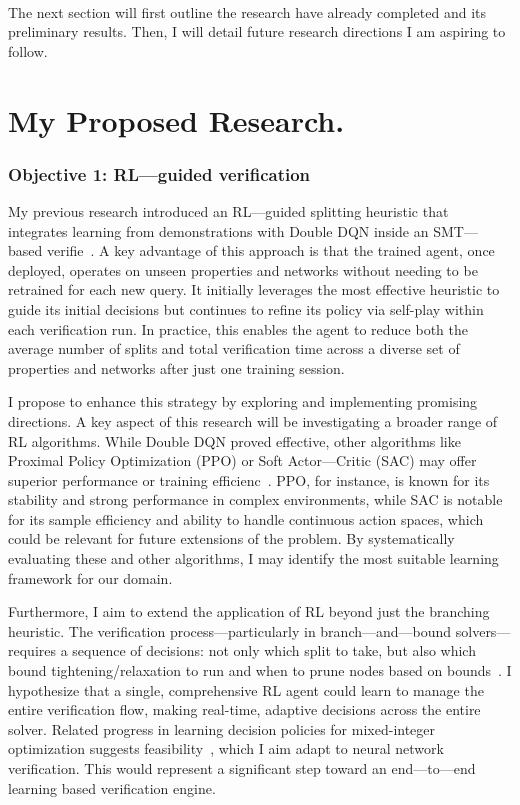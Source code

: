 \documentclass{llncs}
\begin{document}
\paragraph{}
The next section will first outline the research have already completed and its preliminary results. 
Then, I will detail future research directions I am aspiring to follow.

\section{My Proposed Research.}
\subsubsection{Objective 1: RL---guided verification}
My previous research introduced an RL---guided splitting heuristic that integrates learning 
from demonstrations with Double DQN inside an SMT---based verifie~\cite{Katz2019Marabou,KBD17,vanHasselt2016DoubleDQN,hester2018dqfd}.
A key advantage of this approach is that the trained agent, once deployed, operates on unseen 
properties and networks without needing to be retrained for each new query. It initially leverages 
the most effective heuristic to guide its initial decisions but continues to refine its policy via 
self-play within each verification run. In practice, this enables the agent to reduce both the average 
number of splits and total verification time across a diverse set of properties 
and networks after just one training session.

I propose to enhance this strategy by exploring and implementing promising directions. 
A key aspect of this research will be investigating a broader range of RL algorithms. 
While Double DQN proved effective, other algorithms like Proximal Policy Optimization (PPO) or 
Soft Actor---Critic (SAC) may offer superior performance or training efficienc~\cite{Schulman2017PPO,Haarnoja2018SAC}. 
PPO, for instance, is known for its stability and strong performance in complex environments, 
while SAC is notable for its sample efficiency and ability to handle continuous action spaces, 
which could be relevant for future extensions of the problem. By systematically evaluating these 
and other algorithms, I may identify the most suitable learning framework for our domain.

Furthermore, I aim to extend the application of RL beyond just the branching heuristic.
The verification process—particularly in branch---and---bound solvers—requires a sequence of
decisions: not only which split to take, but also which bound tightening/relaxation to run
and when to prune nodes based on bounds~\cite{BLTTKK-JMLR2020,KBD17,Katz2019Marabou}.
I hypothesize that a single, comprehensive RL agent could learn to manage the entire verification flow, making real-time, 
adaptive decisions across the entire solver. Related progress in learning decision policies for 
mixed-integer optimization suggests feasibility~\cite{Khalil2016LearningToBranch,Gasse2019LearningToBranch}, 
which I aim adapt to neural network verification.  
This would represent a significant step toward an end---to---end learning based verification engine.
\end{document}
